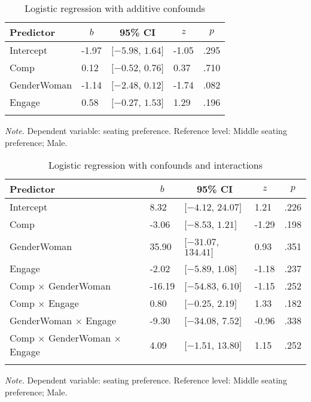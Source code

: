 \documentclass[man]{apa6}
\begin{document}
\begin{table}[tbp]
\begin{center}
\begin{threeparttable}
\caption{\label{tab:Additive model}Logistic regression with additive confounds}
\begin{tabular}{lllll}
\toprule
Predictor & \multicolumn{1}{c}{$b$} & \multicolumn{1}{c}{95\% CI} & \multicolumn{1}{c}{$z$} & \multicolumn{1}{c}{$p$}\\
\midrule
Intercept & -1.97 & $[-5.98$, $1.64]$ & -1.05 & .295\\
Comp & 0.12 & $[-0.52$, $0.76]$ & 0.37 & .710\\
GenderWoman & -1.14 & $[-2.48$, $0.12]$ & -1.74 & .082\\
Engage & 0.58 & $[-0.27$, $1.53]$ & 1.29 & .196\\
\bottomrule
\addlinespace
\end{tabular}
\begin{tablenotes}[para]
\normalsize{\textit{Note.} Dependent variable: seating preference. Reference level: Middle seating preference; Male.}
\end{tablenotes}
\end{threeparttable}
\end{center}
\end{table}

\begin{table}[tbp]
\begin{center}
\begin{threeparttable}
\caption{\label{tab:Multiplicative model}Logistic regression with confounds and interactions}
\begin{tabular}{lllll}
\toprule
Predictor & \multicolumn{1}{c}{$b$} & \multicolumn{1}{c}{95\% CI} & \multicolumn{1}{c}{$z$} & \multicolumn{1}{c}{$p$}\\
\midrule
Intercept & 8.32 & $[-4.12$, $24.07]$ & 1.21 & .226\\
Comp & -3.06 & $[-8.53$, $1.21]$ & -1.29 & .198\\
GenderWoman & 35.90 & $[-31.07$, $134.41]$ & 0.93 & .351\\
Engage & -2.02 & $[-5.89$, $1.08]$ & -1.18 & .237\\
Comp $\times$ GenderWoman & -16.19 & $[-54.83$, $6.10]$ & -1.15 & .252\\
Comp $\times$ Engage & 0.80 & $[-0.25$, $2.19]$ & 1.33 & .182\\
GenderWoman $\times$ Engage & -9.30 & $[-34.08$, $7.52]$ & -0.96 & .338\\
Comp $\times$ GenderWoman $\times$ Engage & 4.09 & $[-1.51$, $13.80]$ & 1.15 & .252\\
\bottomrule
\addlinespace
\end{tabular}
\begin{tablenotes}[para]
\normalsize{\textit{Note.} Dependent variable: seating preference. Reference level: Middle seating preference; Male.}
\end{tablenotes}
\end{threeparttable}
\end{center}
\end{table}
\end{document}
